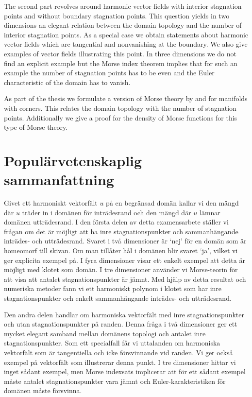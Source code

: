 The second part revolves around harmonic vector fields
with interior stagnation points and without boundary stagnation points.
This question yields in two dimensions an elegant relation between the
domain topology and the number of interior stagnation points. 
As a special case we obtain statements about harmonic vector fields which are tangential and nonvanishing 
at the boundary.
We also give examples of vector fields illustrating this point.
In three dimensions we do not find an explicit example but the Morse index theorem implies
that for such an example the number of stagnation points has to be even and
the Euler characteristic of the domain has to vanish.

As part of the thesis we formulate a version of Morse theory by \cite{Agrach1991}
and \cite{Handron2002}
for manifolds with corners.
This relates the domain topology with the number of stagnation points.
Additionally we give a proof for the density of Morse functions
for this type of Morse theory.

\section*{Populärvetenskaplig sammanfattning}

Givet ett harmoniskt vektorfält $u$ på en begränsad domän kallar vi den mängd där $u$ träder in i
domänen för inträdesrand och den mängd där $u$ lämnar domänen utträdesrand. I den första
delen av detta examensarbete ställer vi frågan om det är möjligt att ha inre stagnationspunkter
och sammanhängande inträdes- och utträdesrand. Svaret i två dimensioner är `nej' för en domän som är homeomorf till skivan. Om man tillåter hål i domänen blir svaret `ja', vilket vi
ger explicita exempel på. I fyra dimensioner visar ett enkelt exempel att detta är möjligt med
klotet som domän. I tre dimensioner använder vi Morse-teorin för att visa att antalet
stagnationspunkter är jämnt. Med hjälp av detta resultat och numeriska metoder fann vi ett harmoniskt
polynom i klotet som har inre stagnationspunkter och enkelt sammanhängande inträdes- och
utträdesrand.

Den andra delen handlar om harmoniska vektorfält med inre
stagnationspunkter och utan stagnationspunkter på randen. Denna fråga i två dimensioner ger
ett mycket elegant samband mellan domänens topologi och antalet inre stagnationspunkter.
Som ett specialfall får vi uttalanden om harmoniska vektorfält som är tangentiella  och icke försvinnande vid
randen. Vi ger också exempel på vektorfält som illustrerar denna punkt. I tre dimensioner
hittar vi inget sådant exempel, men Morse indexsats implicerar att för ett sådant exempel
måste antalet stagnationspunkter vara jämnt och Euler-karakteristiken för domänen måste försvinna.

